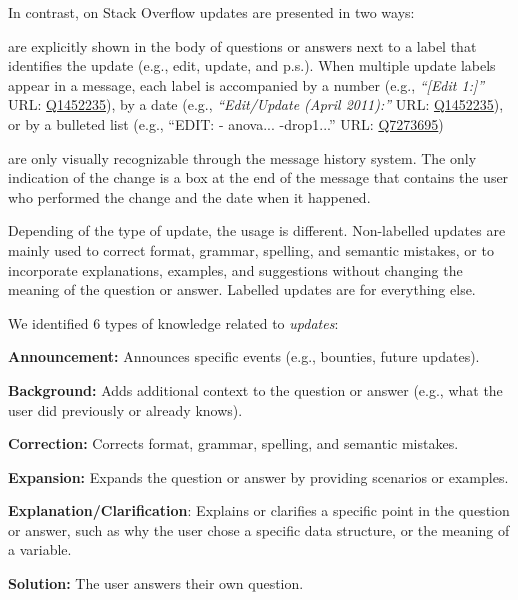     In contrast, on Stack Overflow updates are presented in two ways:
    \begin{description}[itemsep=3pt, topsep=2pt, leftmargin=3em, parsep=0pt]
        \item[Labelled updates] are explicitly shown in the body of questions or answers next to a label that identifies the update (e.g., edit, update, and p.s.).
        When multiple update labels appear in a message, each label is accompanied by a number (e.g., \textit{``[Edit 1:]''} {\footnotesize URL:  \href{http://goo.gl/ptYAG0}{Q1452235}}), by a date (e.g., \textit{``Edit/Update (April 2011):''} {\footnotesize URL:  \href{http://goo.gl/ptYAG0}{Q1452235}}), or by a bulleted list (e.g., ``EDIT: - anova... -drop1...'' {\footnotesize URL:  \href{http://goo.gl/sQiq0M}{Q7273695}})

        \item[Non-labelled updates] are only visually recognizable through the message history system. The only indication of the change is a box at the end of the message that contains the user who performed the change and the date when it happened.
    \end{description}

    Depending of the type of update, the usage is different.
    Non-labelled updates are mainly used to correct format, grammar, spelling, and semantic mistakes, or to incorporate explanations, examples, and suggestions without changing the meaning of the question or answer. Labelled updates are for everything else.

    We identified 6 types of knowledge related to \textit{updates}:
    \begin{packed_enum}
        \item \textbf{Announcement:} Announces specific events (e.g., bounties, future updates).
        \item \textbf{Background:} Adds additional context to the question or answer (e.g., what the user did previously or already knows).
        \item \textbf{Correction:} Corrects format, grammar, spelling, and semantic mistakes.
        \item \textbf{Expansion:} Expands the question or answer by providing scenarios or examples.
        \item \textbf{Explanation/Clarification}: Explains or clarifies a specific point in the question or answer, such as why the user chose a specific data structure, or the meaning of a variable.
        \item \textbf{Solution:} The user answers their own question.
    \end{packed_enum}

